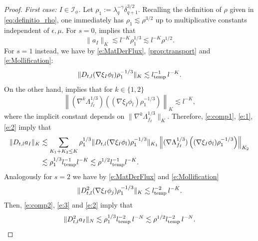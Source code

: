 \documentclass[10pt,a4paper]{amsart}
\numberwithin{equation}{section}
\numberwithin{corollario}{section}
\numberwithin{lemma}{section}
\numberwithin{prop}{section}
\theoremstyle{definition}
\theoremstyle{remark}
\newcommand{\I}{\mathcal{I}}
\begin{document}
\begin{proof}
     \textit{First case: $I\in \I_{\phi}$.}
     Let $\rho_1:=\lambda_q^{-\gamma}\delta_{q+1}^{3/2}$. Recalling the definition of $\rho$ given in \eqref{eq:definitio_rho}, one immediately has $\rho_1 \lesssim \rho^{3/2}$ up to multiplicative constants independent of $\epsilon,\mu$.
      For $s=0$, \cite[Proposition C.1]{BD15+} implies that
      \begin{equation}\label{i:ampPhi0}
          \|a_I\|_K \lesssim l^{-K}\rho_1^{1/3} \lesssim l^{-K}\rho^{1/2}.
      \end{equation}
For $s=1$ instead, we have by \eqref{e:MatDerFlux}, \autoref{prop:transport} and \eqref{e:Mollification}:
      \begin{equation}\label{e:1}
          \|D_{t,l}(\nabla\xi_I\phi_l)\rho_1^{-1/3}\|_K\lesssim l_{\rm temp}^{-1}\,l^{-K}.
      \end{equation}
      On the other hand, \cite[Proposition C.1]{BD15+} implies that for $k \in \{1,2\}$
      \begin{equation}\label{e:2}
          \left\|(\nabla^k \Lambda_{f_I}^{1/3})\left((\nabla\xi_I\phi_l)\rho_1^{-1/3}\right)\right\|_K\lesssim l^{-K},
      \end{equation}
where the implicit constant depends on $\|\nabla^k \Lambda_{f_I}^{1/3}\|_K$.     
Therefore, \eqref{e:comp1}, \eqref{e:1}, \eqref{e:2} imply that
\begin{equation}\label{i:ampPhi1}
\begin{aligned}
           \|D_{t,l}a_I\|_K
           &\lesssim
           \sum_{K_1+K_2\le K}\rho_1^{1/3}\|D_{t,l}(\nabla\xi_I\phi_l)\rho_1^{-1/3}\|_{K_1}\left\|(\nabla \Lambda_{f_I}^{1/3})\left((\nabla\xi_I\phi_l)\rho_1^{-1/3}\right)\right\|_{K_2}
           \\
           &\lesssim
           \rho_1^{1/3}l_{\rm temp}^{-1}l^{-K}
           \lesssim
           \rho^{1/2}l_{\rm temp}^{-1}l^{-K}.
      \end{aligned}
      \end{equation} 
Analogously for $s=2$ we have by \eqref{e:MatDerFlux} and \eqref{e:Mollification} 
      \begin{equation}\label{e:3}
          \|D_{t,l}^2(\nabla \xi_I\phi_j)\rho_1^{-1/3}\|_K \lesssim l_{\rm temp}^{-2}\,l^{-K}
          .
      \end{equation}
Then, \eqref{e:comp2}, \eqref{e:3} and \eqref{e:2} imply that
      \begin{equation}\label{i:amplPhi2}
          \|D_{t,l}^2a_I\|_N \lesssim \rho_1^{1/3}l_{\rm temp}^{-2}\,l^{-N}
          \lesssim \rho^{1/2}l_{\rm temp}^{-2}\,l^{-N}.

\end{equation}
\end{proof}
\end{document}

